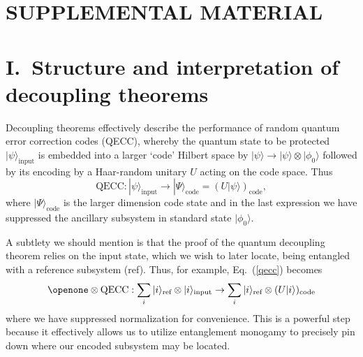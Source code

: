 \documentclass[twocolumn,aps,showpacs,prl]{revtex4}
\begin{document}
\section*{SUPPLEMENTAL MATERIAL}


\section{I.\ Structure and interpretation of decoupling theorems}

Decoupling theorems effectively describe the performance of random
quantum error correction codes (QECC), whereby the quantum state
to be protected $|\psi\rangle_{\text{input}}$ is embedded into a
larger `code' Hilbert space by
$|\psi\rangle\rightarrow |\psi\rangle\otimes |\phi_0\rangle$ followed by
its encoding by a Haar-random unitary $U$ acting on the code space. Thus
\begin{equation}
\text{QECC}:|\psi\rangle_{\text{input}}\rightarrow
|\Psi\rangle_{\text{code}}=(U|\psi\rangle)_{\text{code}},
\label{qecc}
\end{equation}
where $|\Psi\rangle_{\text{code}}$ is the larger dimension code state
and in the last expression we have suppressed the ancillary subsystem
in standard state $|\phi_0\rangle$.

A subtlety we should mention is that the proof of the quantum
decoupling theorem relies on the input state, which we wish to later
locate, being entangled with a reference subsystem (ref). Thus, for
example, Eq.~(\ref{qecc}) becomes
\begin{equation}
\openone\otimes \text{QECC}:\sum_i|i\rangle_{\text{ref}}
\otimes |i\rangle_{\text{input}}
\rightarrow
\sum_i|i\rangle_{\text{ref}}\otimes(U|i\rangle)_{\text{code}}
\label{eqecc}
\end{equation}
where we have suppressed normalization for convenience.
This is a powerful step because it effectively allows us to utilize
entanglement monogamy to precisely pin down where our encoded
subsystem may be located.
\end{document}
